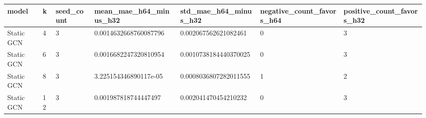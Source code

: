 \begin{tabular}{lllllll}
\hline
model & k & seed\_count & mean\_mae\_h64\_minus\_h32 & std\_mae\_h64\_minus\_h32 & negative\_count\_favors\_h64 & positive\_count\_favors\_h32 \\
\hline
Static GCN & 4 & 3 & 0.0014632668760087796 & 0.002067562621082461 & 0 & 3 \\
Static GCN & 6 & 3 & 0.0016682247320810954 & 0.0010738184440370025 & 0 & 3 \\
Static GCN & 8 & 3 & 3.225154346890117e-05 & 0.0008036807282011555 & 1 & 2 \\
Static GCN & 12 & 3 & 0.001987818744447497 & 0.002041470454210232 & 0 & 3 \\
\hline
\end{tabular}

